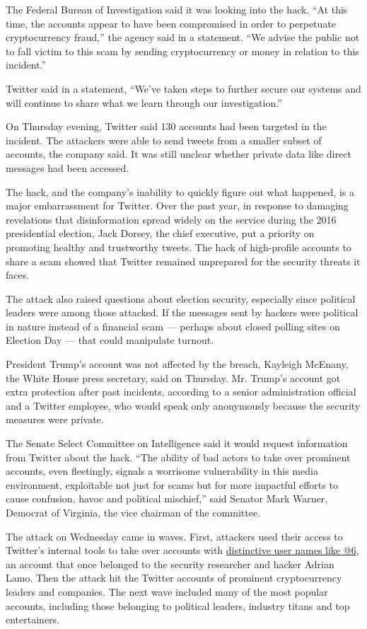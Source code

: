 The Federal Bureau of Investigation said it was looking into the hack.
``At this time, the accounts appear to have been compromised in order to
perpetuate cryptocurrency fraud,'' the agency said in a statement. ``We
advise the public not to fall victim to this scam by sending
cryptocurrency or money in relation to this incident.''

Twitter said in a statement, ``We've taken steps to further secure our
systems and will continue to share what we learn through our
investigation.''

On Thursday evening, Twitter said 130 accounts had been targeted in the
incident. The attackers were able to send tweets from a smaller subset
of accounts, the company said. It was still unclear whether private data
like direct messages had been accessed.

The hack, and the company's inability to quickly figure out what
happened, is a major embarrassment for Twitter. Over the past year, in
response to damaging revelations that disinformation spread widely on
the service during the 2016 presidential election, Jack Dorsey, the
chief executive, put a priority on promoting healthy and trustworthy
tweets. The hack of high-profile accounts to share a scam showed that
Twitter remained unprepared for the security threats it faces.

The attack also raised questions about election security, especially
since political leaders were among those attacked. If the messages sent
by hackers were political in nature instead of a financial scam ---
perhaps about closed polling sites on Election Day --- that could
manipulate turnout.

President Trump's account was not affected by the breach, Kayleigh
McEnany, the White House press secretary, said on Thursday. Mr. Trump's
account got extra protection after past incidents, according to a senior
administration official and a Twitter employee, who would speak only
anonymously because the security measures were private.

The Senate Select Committee on Intelligence said it would request
information from Twitter about the hack. ``The ability of bad actors to
take over prominent accounts, even fleetingly, signals a worrisome
vulnerability in this media environment, exploitable not just for scams
but for more impactful efforts to cause confusion, havoc and political
mischief,'' said Senator Mark Warner, Democrat of Virginia, the vice
chairman of the committee.

The attack on Wednesday came in waves. First, attackers used their
access to Twitter's internal tools to take over accounts with
\href{https://medium.com/@lucky225/the-twitter-hack-what-exactly-happened-d8740d33c1c}{distinctive
user names like @6}, an account that once belonged to the security
researcher and hacker Adrian Lamo. Then the attack hit the Twitter
accounts of prominent cryptocurrency leaders and companies. The next
wave included many of the most popular accounts, including those
belonging to political leaders, industry titans and top entertainers.

